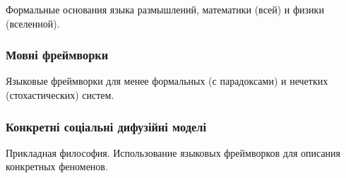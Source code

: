 Формальные основания языка размышлений, математики (всей) и физики (вселенной).

\subsubsection{Мовні фреймворки}

Языковые фреймворки для менее формальных (с парадоксами) и нечетких (стохастических) систем.

\subsubsection{Конкретні соціальні дифузійні моделі}

Прикладная философия. Использование языковых фреймворков для описания конкретных феноменов.

\normalsize

